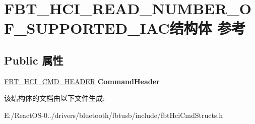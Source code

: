 \hypertarget{struct_f_b_t___h_c_i___r_e_a_d___n_u_m_b_e_r___o_f___s_u_p_p_o_r_t_e_d___i_a_c}{}\section{F\+B\+T\+\_\+\+H\+C\+I\+\_\+\+R\+E\+A\+D\+\_\+\+N\+U\+M\+B\+E\+R\+\_\+\+O\+F\+\_\+\+S\+U\+P\+P\+O\+R\+T\+E\+D\+\_\+\+I\+A\+C结构体 参考}
\label{struct_f_b_t___h_c_i___r_e_a_d___n_u_m_b_e_r___o_f___s_u_p_p_o_r_t_e_d___i_a_c}
\subsection*{Public 属性}
\begin{DoxyCompactItemize}
\item 
\mbox{\label{struct_f_b_t___h_c_i___r_e_a_d___n_u_m_b_e_r___o_f___s_u_p_p_o_r_t_e_d___i_a_c_a519aeccf0e92dbc553ab5452e7464585}} 
\hyperlink{struct_f_b_t___h_c_i___c_m_d___h_e_a_d_e_r}{F\+B\+T\+\_\+\+H\+C\+I\+\_\+\+C\+M\+D\+\_\+\+H\+E\+A\+D\+ER} {\bfseries Command\+Header}
\end{DoxyCompactItemize}


该结构体的文档由以下文件生成\+:\begin{DoxyCompactItemize}
\item 
E\+:/\+React\+O\+S-\/0../drivers/bluetooth/fbtusb/include/fbt\+Hci\+Cmd\+Structs.\+h\end{DoxyCompactItemize}
